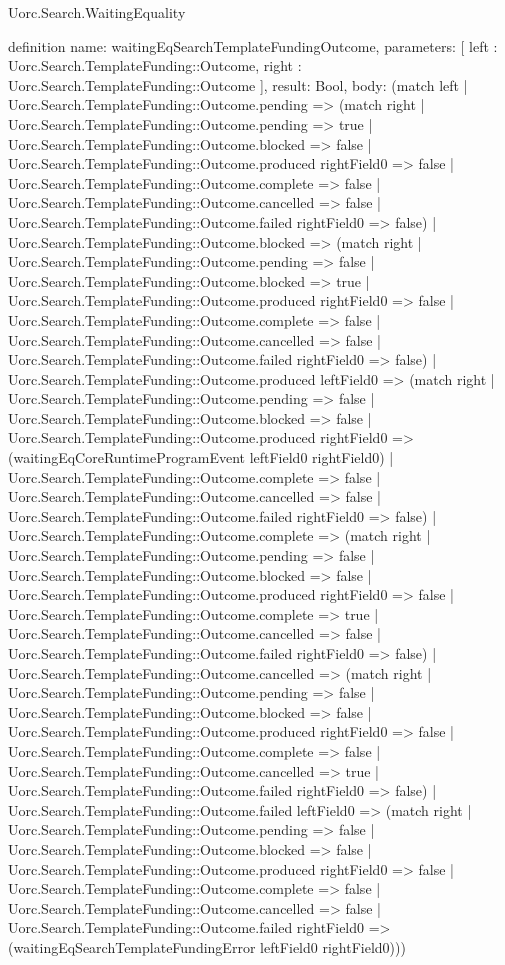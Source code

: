 \begin{lexlean}{Uorc.Search.WaitingEquality}
\begin{semanticmodule}
definition{
  name: waitingEqSearchTemplateFundingOutcome,
  parameters: [
    left : Uorc.Search.TemplateFunding::Outcome,
    right : Uorc.Search.TemplateFunding::Outcome
  ],
  result: Bool,
  body: (match left
    | Uorc.Search.TemplateFunding::Outcome.pending => (match right
      | Uorc.Search.TemplateFunding::Outcome.pending => true
      | Uorc.Search.TemplateFunding::Outcome.blocked => false
      | Uorc.Search.TemplateFunding::Outcome.produced rightField0 => false
      | Uorc.Search.TemplateFunding::Outcome.complete => false
      | Uorc.Search.TemplateFunding::Outcome.cancelled => false
      | Uorc.Search.TemplateFunding::Outcome.failed rightField0 => false)
    | Uorc.Search.TemplateFunding::Outcome.blocked => (match right
      | Uorc.Search.TemplateFunding::Outcome.pending => false
      | Uorc.Search.TemplateFunding::Outcome.blocked => true
      | Uorc.Search.TemplateFunding::Outcome.produced rightField0 => false
      | Uorc.Search.TemplateFunding::Outcome.complete => false
      | Uorc.Search.TemplateFunding::Outcome.cancelled => false
      | Uorc.Search.TemplateFunding::Outcome.failed rightField0 => false)
    | Uorc.Search.TemplateFunding::Outcome.produced leftField0 => (match right
      | Uorc.Search.TemplateFunding::Outcome.pending => false
      | Uorc.Search.TemplateFunding::Outcome.blocked => false
      | Uorc.Search.TemplateFunding::Outcome.produced rightField0 => (waitingEqCoreRuntimeProgramEvent leftField0 rightField0)
      | Uorc.Search.TemplateFunding::Outcome.complete => false
      | Uorc.Search.TemplateFunding::Outcome.cancelled => false
      | Uorc.Search.TemplateFunding::Outcome.failed rightField0 => false)
    | Uorc.Search.TemplateFunding::Outcome.complete => (match right
      | Uorc.Search.TemplateFunding::Outcome.pending => false
      | Uorc.Search.TemplateFunding::Outcome.blocked => false
      | Uorc.Search.TemplateFunding::Outcome.produced rightField0 => false
      | Uorc.Search.TemplateFunding::Outcome.complete => true
      | Uorc.Search.TemplateFunding::Outcome.cancelled => false
      | Uorc.Search.TemplateFunding::Outcome.failed rightField0 => false)
    | Uorc.Search.TemplateFunding::Outcome.cancelled => (match right
      | Uorc.Search.TemplateFunding::Outcome.pending => false
      | Uorc.Search.TemplateFunding::Outcome.blocked => false
      | Uorc.Search.TemplateFunding::Outcome.produced rightField0 => false
      | Uorc.Search.TemplateFunding::Outcome.complete => false
      | Uorc.Search.TemplateFunding::Outcome.cancelled => true
      | Uorc.Search.TemplateFunding::Outcome.failed rightField0 => false)
    | Uorc.Search.TemplateFunding::Outcome.failed leftField0 => (match right
      | Uorc.Search.TemplateFunding::Outcome.pending => false
      | Uorc.Search.TemplateFunding::Outcome.blocked => false
      | Uorc.Search.TemplateFunding::Outcome.produced rightField0 => false
      | Uorc.Search.TemplateFunding::Outcome.complete => false
      | Uorc.Search.TemplateFunding::Outcome.cancelled => false
      | Uorc.Search.TemplateFunding::Outcome.failed rightField0 => (waitingEqSearchTemplateFundingError leftField0 rightField0)))
}


\end{semanticmodule}
\end{lexlean}
